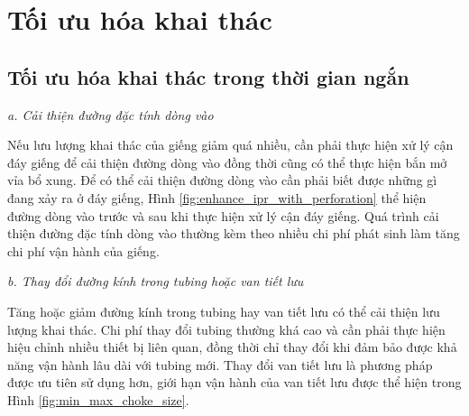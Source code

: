 \documentclass[12pt,a4paper]{report}
\begin{document}
\section{Tối ưu hóa khai thác}
\subsection{Tối ưu hóa khai thác trong thời gian ngắn}

\textit{a. Cải thiện đường đặc tính dòng vào}

Nếu lưu lượng khai thác của giếng giảm quá nhiều, cần phải thực hiện xử lý cận đáy giếng để cải thiện đường dòng vào đồng thời cũng có thể thực hiện bắn mở vỉa bổ xung. Để có thể cải thiện đường dòng vào cần phải biết được những gì đang xảy ra ở đáy giếng, Hình \ref{fig:enhance_ipr_with_perforation} thể hiện đường dòng vào trước và sau khi thực hiện xử lý cận đáy giếng. Quá trình cải thiện đường đặc tính dòng vào thường kèm theo nhiều chi phí phát sinh làm tăng chi phí vận hành của giếng.

\textit{b. Thay đổi đường kính trong tubing hoặc van tiết lưu}

Tăng hoặc giảm đường kính trong tubing hay van tiết lưu có thể cải thiện lưu lượng khai thác. Chi phí thay đổi tubing thường khá cao và cần phải thực hiện hiệu chỉnh nhiều thiết bị liên quan, đồng thời chỉ thay đổi khi đảm bảo được khả năng vận hành lâu dài với tubing mới. Thay đổi van tiết lưu là phương pháp được ưu tiên sử dụng hơn, giới hạn vận hành của van tiết lưu được thể hiện trong Hình \ref{fig:min_max_choke_size}.
\end{document}
